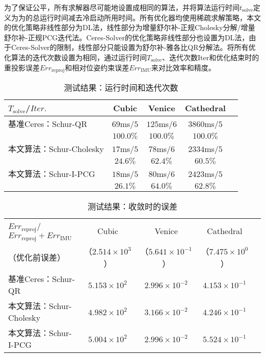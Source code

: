 为了保证公平，所有求解器尽可能地设置成相同的算法，并将算法运行时间$t_{\text{solve}}$定义为为的总运行时间减去冷启动所用时间。所有优化器均使用稀疏求解策略，本文的优化策略非线性部分为DL法，线性部分为增量舒尔补-正规Cholesky分解/增量舒尔补-正规PCG迭代法。Ceres-Solver的优化策略非线性部分也设置为DL法，由于Ceres-Solver的限制，线性部分只能设置为舒尔补-雅各比QR分解法。将所有优化算法的迭代次数设置为相同，通过运行时间$T_{\text{solve}}$、迭代次数Iter和优化结束时的重投影误差$Err_{\text{reproj}}$和相对位姿约束误差$Err_{\text{IMU}}$来对比效率和精度。

{
\linespread{1}
\begin{table}[htb!]
\caption{测试结果：运行时间和迭代次数}
\label{tab:time}
\centering
\begin{tabular}[b]{l|cccc}
    \toprule
    $T_{\text{solve}}$/$Iter.$ &      Cubic & Venice      &    Cathedral \\ \midrule
    基准Ceres：Schur-QR        & $69$ms/$5$ & $125$ms/$6$ & $3860$ms/$5$ \\
                               &  $100.0\%$ & $100.0\%$   &    $100.0\%$ \\ \midrule
    本文算法：Schur-Cholesky   & $17$ms/$5$ & $78$ms/$6$  & $2334$ms/$5$ \\
                               &   $24.6\%$ & $62.4\%$    &     $60.5\%$ \\ \midrule
    本文算法：Schur-I-PCG      & $18$ms/$5$ & $80$ms/$6$  & $2423$ms/$5$ \\
                               &   $26.1\%$ & $64.0\%$    &     $62.8\%$ \\
    \bottomrule
\end{tabular}
\end{table}
}

{
\linespread{1}
\begin{table}[htb!]
\caption{测试结果：收敛时的误差}
\label{tab:energy}
\centering
\begin{tabular}[b]{l|cccc}
    \toprule $Err_{\text{reproj}}$/
    $Err_{\text{reproj}}+Err_{\text{IMU}}$ &                 Cubic & Venice                   &               Cathedral \\
    （优化前误差）                         & （$2.514\times10^3$） & （$5.641\times10^{-1}$） & （$7.475\times10^{0}$） \\ \midrule
    基准Ceres：Schur-QR                    &     $5.153\times10^2$ & $2.996\times10^{-2}$     &    $4.153\times10^{-1}$ \\
    本文算法：Schur-Cholesky               &     $4.982\times10^2$ & $3.166\times10^{-2}$     &    $4.246\times10^{-1}$ \\
    本文算法：Schur-I-PCG                  &     $5.004\times10^2$ & $2.996\times10^{-2}$     &    $5.524\times10^{-1}$ \\
    \bottomrule
\end{tabular}
\end{table}
}

